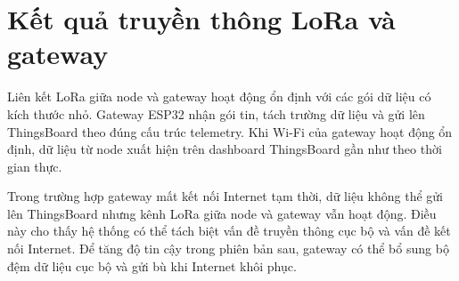 \section{Kết quả truyền thông LoRa và gateway}
Liên kết LoRa giữa node và gateway hoạt động ổn định với các gói dữ liệu có kích thước nhỏ. Gateway ESP32 nhận gói tin, tách trường dữ liệu và gửi lên ThingsBoard theo đúng cấu trúc telemetry. Khi Wi-Fi của gateway hoạt động ổn định, dữ liệu từ node xuất hiện trên dashboard ThingsBoard gần như theo thời gian thực.

Trong trường hợp gateway mất kết nối Internet tạm thời, dữ liệu không thể gửi lên ThingsBoard nhưng kênh LoRa giữa node và gateway vẫn hoạt động. Điều này cho thấy hệ thống có thể tách biệt vấn đề truyền thông cục bộ và vấn đề kết nối Internet. Để tăng độ tin cậy trong phiên bản sau, gateway có thể bổ sung bộ đệm dữ liệu cục bộ và gửi bù khi Internet khôi phục.
